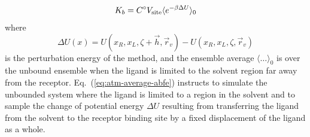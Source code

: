 \documentclass[9pt,bestpractices]{livecoms}
\begin{document}
\begin{equation}\label{eq:atm-average-abfe}
K_b = C^\circ V_{\rm site} \langle e^{-\beta \Delta U} \rangle_0
\end{equation}
where
\begin{equation}\label{eq:atm-deltaU-def}
\Delta U(x) = U(x_R, x_L, \zeta + \vec{h}, \vec{r}_v) - U(x_R, x_L, \zeta, \vec{r}_v)
\end{equation}
is the perturbation energy of the method, and the ensemble average $\langle \ldots \rangle_0$ is over the unbound ensemble when the ligand is limited to the solvent region far away from the receptor. Eq.~(\ref{eq:atm-average-abfe}) instructs to simulate the unbounded system where the ligand is limited to a region in the solvent and to sample the change of potential energy $\Delta U$ resulting from transferring the ligand from the solvent to the receptor binding site by a fixed displacement of the ligand as a whole.
\end{document}
